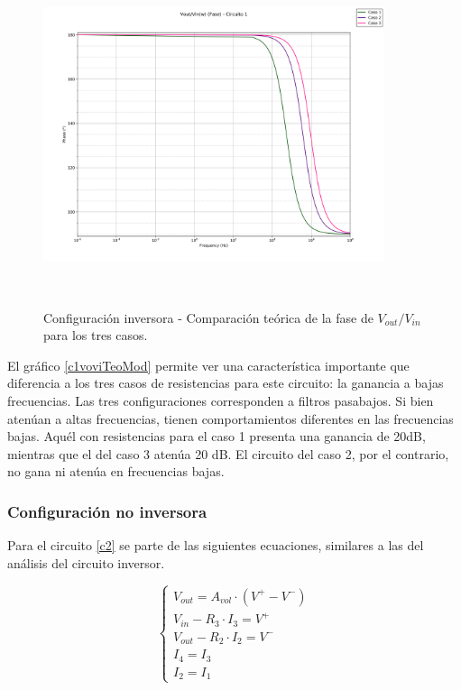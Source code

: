 \begin{figure}[H] %
	\centering
	\includegraphics[width=10cm,height=10cm,keepaspectratio]{../EJ1/00GRAFICOS/teoricos/circ1vovifasew.png}
	\caption{Configuración inversora - Comparaci\'on te\'orica de la fase de $V_{out}/V_{in}$ para los tres casos.}
	\label{c1voviTeoPh}
\end{figure}

El gr\'afico \ref{c1voviTeoMod} permite ver una caracter\'istica importante que diferencia a los tres casos de 
resistencias para este circuito: la ganancia a bajas frecuencias. Las tres configuraciones corresponden 
a filtros pasabajos. Si bien aten\'uan a altas frecuencias, 
tienen comportamientos diferentes en las frecuencias bajas. 
Aqu\'el con resistencias para el caso 1 presenta una ganancia de 20dB, 
mientras que el del caso 3 aten\'ua 20 dB. El circuito del caso 2, por el contrario, no gana ni aten\'ua 
en frecuencias bajas.


\subsubsection*{Configuraci\'on no inversora}

Para el circuito \ref{c2} se parte de las siguientes ecuaciones, similares a las del an\'alisis del circuito inversor. 

\begin{equation}
	\begin{cases}
		V_{out} = A_{vol}\cdot(V^+ - V^-) \\
		V_{in} - R_3 \cdot I_3 = V^+ \\
		V_{out} - R_2 \cdot I_2 = V^- \\
		I_4 = I_3\\
		I_2 = I_1
	\end{cases}
	\label{ecsbase2}
\end{equation}



